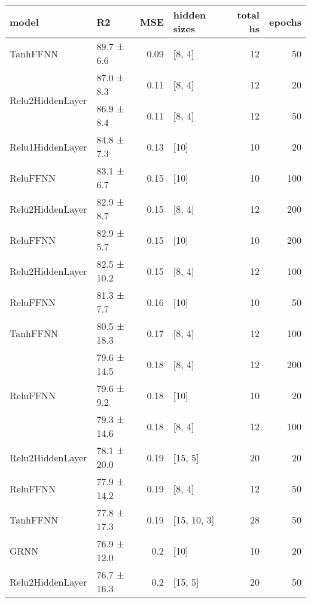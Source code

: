 
    \begin{table*}[h]
        \centering
        \begin{tabular}{llrlrr}
\hline
 model   & R2          &   MSE & hidden sizes   &   total hs &   epochs \\
\hline
 \hline
TanhFFNN         & 89.7 ± 6.6  &  0.09 & [8, 4]         &         12 &       50 \\
 \hline
\multirow{2}{*}{Relu2HiddenLayer}         & 87.0 ± 8.3  &  0.11 & [8, 4]         &         12 &       20 \\
         & 86.9 ± 8.4  &  0.11 & [8, 4]         &         12 &       50 \\
 \hline
Relu1HiddenLayer         & 84.8 ± 7.3  &  0.13 & [10]           &         10 &       20 \\
 \hline
ReluFFNN         & 83.1 ± 6.7  &  0.15 & [10]           &         10 &      100 \\
 \hline
Relu2HiddenLayer         & 82.9 ± 8.7  &  0.15 & [8, 4]         &         12 &      200 \\
 \hline
ReluFFNN         & 82.9 ± 5.7  &  0.15 & [10]           &         10 &      200 \\
 \hline
Relu2HiddenLayer         & 82.5 ± 10.2 &  0.15 & [8, 4]         &         12 &      100 \\
 \hline
ReluFFNN         & 81.3 ± 7.7  &  0.16 & [10]           &         10 &       50 \\
 \hline
TanhFFNN         & 80.5 ± 18.3 &  0.17 & [8, 4]         &         12 &      100 \\
 \hline
\multirow{3}{*}{ReluFFNN}         & 79.6 ± 14.5 &  0.18 & [8, 4]         &         12 &      200 \\
         & 79.6 ± 9.2  &  0.18 & [10]           &         10 &       20 \\
         & 79.3 ± 14.6 &  0.18 & [8, 4]         &         12 &      100 \\
 \hline
Relu2HiddenLayer         & 78.1 ± 20.0 &  0.19 & [15, 5]        &         20 &       20 \\
 \hline
ReluFFNN         & 77.9 ± 14.2 &  0.19 & [8, 4]         &         12 &       50 \\
 \hline
TanhFFNN         & 77.8 ± 17.3 &  0.19 & [15, 10, 3]    &         28 &       50 \\
 \hline
GRNN         & 76.9 ± 12.0 &  0.2  & [10]           &         10 &       20 \\
 \hline
\multirow{2}{*}{Relu2HiddenLayer}         & 76.7 ± 16.3 &  0.2  & [15, 5]        &         20 &       50 \\

\end{tabular}
\end{table*}
